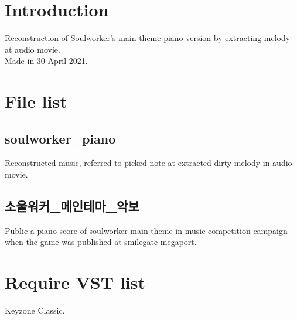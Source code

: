 \documentclass{article}
\author{Seycho Han}
\begin{document}
\section{Introduction}
Reconstruction of Soulworker\cite{soulworkergame}'s main theme piano version by extracting melody at audio movie\cite{soulworkerpiano}.\\
Made in 30 April 2021.
\\

\section{File list}
\subsection{soulworker\_piano}
Reconstructed music, referred to picked note at extracted dirty melody in audio movie\cite{soulworkerpiano}.
\\

\subsection{소울워커\_메인테마\_악보}
Public a piano score of soulworker main theme in music competition campaign when the game was published at smilegate megaport.
\\

\section{Require VST list}
Keyzone Classic\cite{keyzone}.
\\



\end{document}
